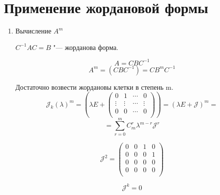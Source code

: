 \section{Применение жордановой формы}
\begin{enumerate}
\item Вычисление $A^{m}$

$C^{-1}AC = B$ "--- жорданова форма.

$$A = CBC^{-1}$$
$$A^{m} = (CBC^{-1}) = CB^{m}C^{-1}$$

Достаточно возвести жордановы клетки в степень m.
$$\mathcal{J}_k(\lambda)^m = (\lambda E + 
\begin{pmatrix}
0&1&\cdots&0\\
\vdots&\vdots&\cdots&\vdots\\
0&0&\cdots&0\\
\end{pmatrix}) = (\lambda E + \mathcal{J})^m = $$
$$= \sum_{r = 0}^{m}C_m^{r}\lambda^{m - r}\mathcal{J}^r$$

$$ 
\mathcal{J}^2 = \begin{pmatrix}
0&0&1&0\\
0&0&0&1\\
0&0&0&0\\
0&0&0&0\\
\end{pmatrix}
$$

$$\mathcal{J}^k = 0$$


\end{enumerate}
